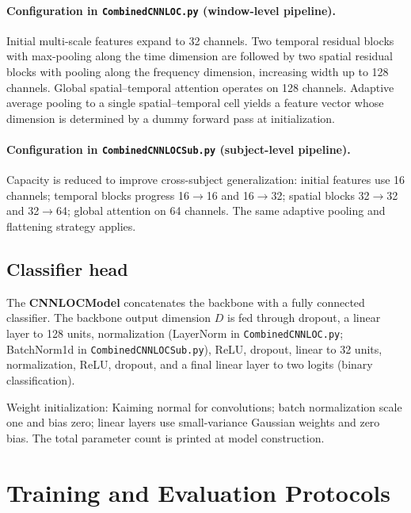 \documentclass[11pt,a4paper]{article}
\newcommand{\py}[1]{\texttt{#1}}
\begin{document}
\paragraph{Configuration in \py{CombinedCNNLOC.py} (window-level pipeline).} Initial multi-scale features expand to 32 channels. Two temporal residual blocks with max-pooling along the time dimension are followed by two spatial residual blocks with pooling along the frequency dimension, increasing width up to 128 channels. Global spatial--temporal attention operates on 128 channels. Adaptive average pooling to a single spatial--temporal cell yields a feature vector whose dimension is determined by a dummy forward pass at initialization.

\paragraph{Configuration in \py{CombinedCNNLOCSub.py} (subject-level pipeline).} Capacity is reduced to improve cross-subject generalization: initial features use 16 channels; temporal blocks progress 16$\to$16 and 16$\to$32; spatial blocks 32$\to$32 and 32$\to$64; global attention on 64 channels. The same adaptive pooling and flattening strategy applies.

\subsection{Classifier head}
\label{sec:classifier}

The \textbf{CNNLOCModel} concatenates the backbone with a fully connected classifier. The backbone output dimension $D$ is fed through dropout, a linear layer to 128 units, normalization (LayerNorm in \py{CombinedCNNLOC.py}; BatchNorm1d in \py{CombinedCNNLOCSub.py}), ReLU, dropout, linear to 32 units, normalization, ReLU, dropout, and a final linear layer to two logits (binary classification).

Weight initialization: Kaiming normal for convolutions; batch normalization scale one and bias zero; linear layers use small-variance Gaussian weights and zero bias. The total parameter count is printed at model construction.

\section{Training and Evaluation Protocols}
\label{sec:training}
\end{document}
